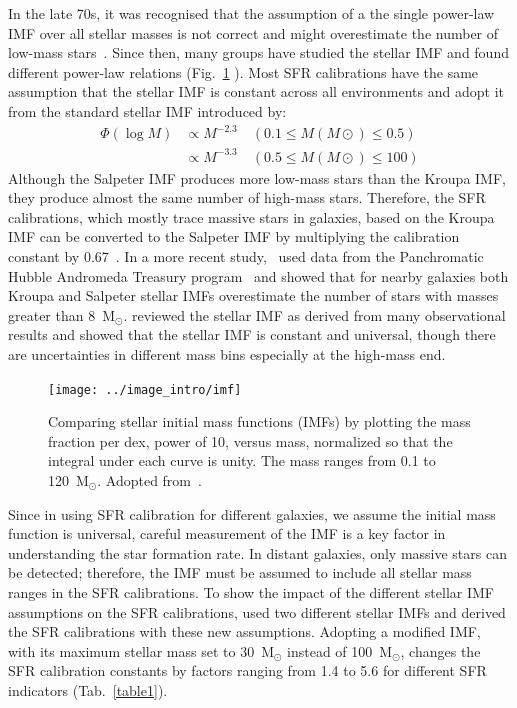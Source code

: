 In the late 70s, it was recognised that the assumption of a the single power-law IMF over all stellar masses is not correct and might overestimate the number of low-mass stars~\citep{Kroupa93, Bastin10}. 
Since then, many groups have studied the stellar IMF and found different power-law relations (Fig.~\ref{fig: imf} ). 
Most SFR calibrations have the same assumption that the stellar IMF is constant across all environments and adopt it from the standard stellar IMF introduced by\cite{Kroupa01}:
\begin{equation}
\begin{split}
    \Phi (\log M) & \propto M^{-2.3}    \quad    (0.1 \le M(M{\odot}) \le 0.5)\\                  
           & \propto M^{-3.3}    \quad    (0.5 \le M(M{\odot}) \le 100)
\end{split}
\end{equation}
Although the Salpeter IMF produces more low-mass stars than the Kroupa IMF, they produce almost the same number of high-mass stars. 
Therefore, the SFR calibrations, which mostly trace massive stars in galaxies, based on the Kroupa IMF can be converted to the Salpeter IMF by multiplying the calibration constant by 0.67~\citep{Madau14}.
In a more recent study,~\cite{Weisz15} used data from the Panchromatic Hubble Andromeda Treasury program~\citep[PHAT][]{Dalcanton12} and showed that for nearby galaxies both Kroupa and Salpeter stellar IMFs overestimate the number of stars with masses greater than 8~M$_\odot$.
\cite{Bastin10} reviewed the stellar IMF as derived from many observational results and showed that the stellar IMF is constant and universal, though there are uncertainties in different mass bins especially at the high-mass end. 

\begin{figure}
\label{fig: imf}
\centering
\texttt{[image: ../image\_intro/imf]}
\small
\caption{Comparing stellar initial mass functions (IMFs) by plotting the mass fraction per dex, power of 10, versus mass, normalized so that the integral under each curve is unity. The mass ranges from 0.1 to 120~M$_\odot$. Adopted from~\cite{Baldry03}.} 
\end{figure}


Since in using SFR calibration for different galaxies, we assume the initial mass function is universal, careful measurement of the IMF is a key factor in understanding the star formation rate. 
In distant galaxies, only massive stars can be detected; therefore, the IMF must be assumed to include all stellar mass ranges in the SFR calibrations. 
To show the impact of the different stellar IMF assumptions on the SFR calibrations, \cite{Calzetti13} used two different stellar IMFs and derived the SFR calibrations with these new assumptions.
Adopting a modified \cite{Kroupa01} IMF, with its maximum stellar mass set to 30~M$_{\odot}$ instead of 100~M$_{\odot}$, changes the SFR calibration constants by factors ranging from 1.4 to 5.6 for different SFR indicators (Tab.~\ref{table1}). 


